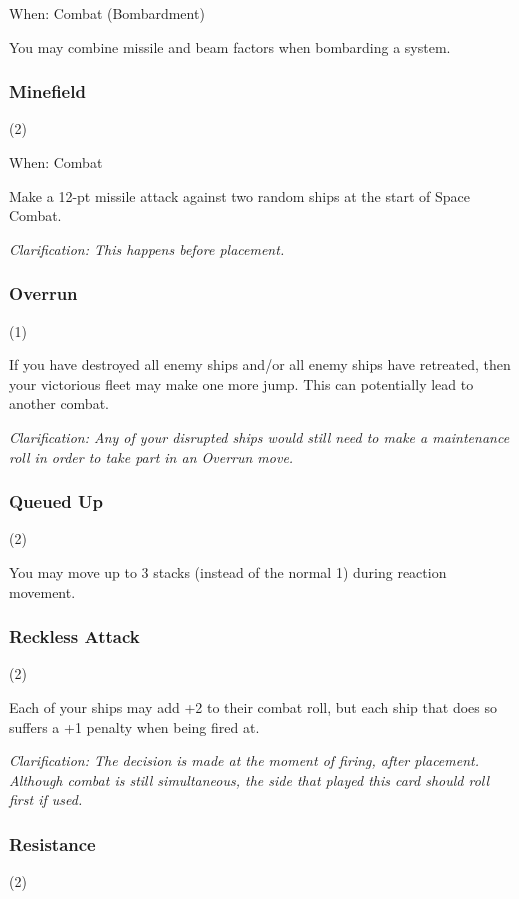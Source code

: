When:  Combat (Bombardment)

You may combine missile and beam factors when bombarding a system.

\subsubsection{Minefield} (2)

When: Combat

Make a 12-pt missile attack against two random ships at the start of Space Combat.

\textit{Clarification: This happens before placement.}

\subsubsection{Overrun} (1)


If you have destroyed all enemy ships and/or all enemy ships have retreated, then your victorious fleet may make one more jump. This can potentially lead to another combat.

\textit{Clarification: Any of your disrupted ships would still need to make a maintenance roll in order to take part in an Overrun move.}

\subsubsection{Queued Up} (2)


You may move up to 3 stacks (instead of the normal 1) during reaction movement.

\subsubsection{Reckless Attack} (2)


Each of your ships may add +2 to their combat roll, but each ship that does so suffers a +1 penalty when being fired at.

\textit{Clarification: The decision is made at the moment of firing, after placement. Although combat is still simultaneous, the side that played this card should roll first if used.}

\subsubsection{Resistance} (2)


